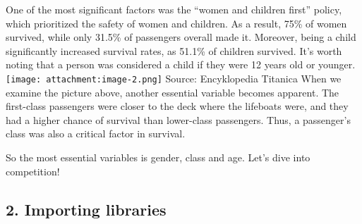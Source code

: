 \documentclass[11pt]{article}
\begin{document}
One of the most significant factors was the ``women and children first''
policy, which prioritized the safety of women and children. As a result,
75\% of women survived, while only 31.5\% of passengers overall made it.
Moreover, being a child significantly increased survival rates, as
51.1\% of children survived. It's worth noting that a person was
considered a child if they were 12 years old or younger.
\texttt{[image: attachment:image-2.png]} Source: Encyklopedia Titanica
When we examine the picture above, another essential variable becomes
apparent. The first-class passengers were closer to the deck where the
lifeboats were, and they had a higher chance of survival than
lower-class passengers. Thus, a passenger's class was also a critical
factor in survival.

So the most essential variables is gender, class and age. Let's dive
into competition!

    \hypertarget{importing-libraries}{%
\subsection{2. Importing libraries}\label{importing-libraries}}
\end{document}
